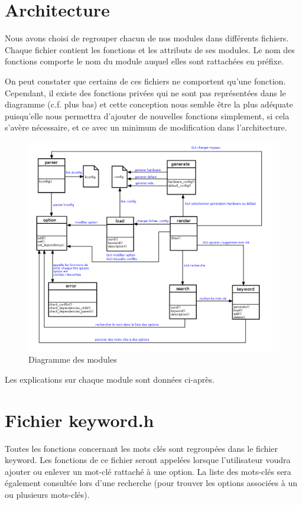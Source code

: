 \documentclass[16pts]{report}
\begin{document}

\nocite{*}

\chapter{Architecture}
\label{cha:Architecture}

Nous avons choisi de regrouper chacun de nos modules dans différents fichiers.
Chaque fichier contient les fonctions et les attributs de ses modules. Le nom
des fonctions comporte le nom du module auquel elles sont rattachées en
préfixe.

On peut constater que certains de ces fichiers ne comportent qu’une fonction.
Cependant, il existe des fonctions privées qui ne sont pas représentées dans le
diagramme (c.f. plus bas) et cette conception nous semble être la plus adéquate
puisqu’elle nous permettra d’ajouter de nouvelles fonctions simplement, si cela
s'avère nécessaire, et ce avec un minimum de modification dans l’architecture.

\begin{figure}[H]
    \includegraphics[scale=0.5]{illustrations/diagramme_architecture.png}
    \centering
    \caption{Diagramme des modules}
    \label{fig:DMod}
\end{figure}


Les explications sur chaque module sont données ci-après.

\chapter{Fichier keyword.h}
\label{cha:Fichier keyword.h}
Toutes les fonctions concernant les mots clés sont regroupées dans le fichier
keyword. Les fonctions de ce fichier seront appelées lorsque l’utilisateur
voudra ajouter ou enlever un mot-clé rattaché à une option. La liste des
mots-clés sera également consultée lors d’une recherche (pour trouver les
options associées à un ou plusieurs mots-clés).
\end{document}
